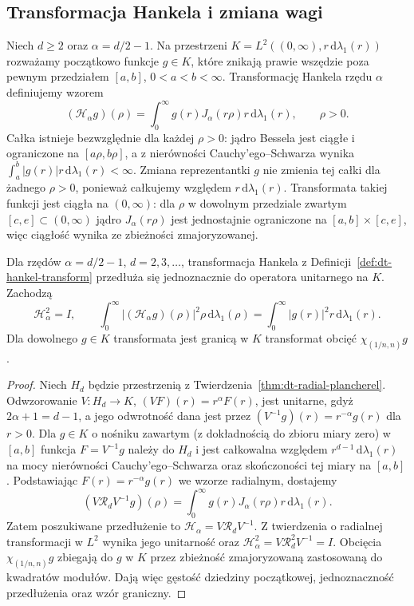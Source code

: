 \subsection{Transformacja Hankela i zmiana wagi}

\begin{definicja}
\label{def:dt-hankel-transform}
Niech $d\ge2$ oraz $\alpha=d/2-1$. Na przestrzeni
$K=L^2((0,\infty),r\,\mathrm d\lambda_1(r))$
rozważamy początkowo funkcje $g\in K$, które znikają
prawie wszędzie poza pewnym przedziałem $[a,b]$,
$0<a<b<\infty$. Transformację Hankela rzędu $\alpha$
definiujemy wzorem
\[
 (\mathcal H_\alpha g)(\rho)
 =\int_0^\infty g(r)J_\alpha(r\rho)r\,
 \mathrm d\lambda_1(r),\qquad \rho>0.
\]
Całka istnieje bezwzględnie dla każdej $\rho>0$:
jądro Bessela jest ciągłe i ograniczone na $[a\rho,b\rho]$,
a z nierówności Cauchy'ego--Schwarza wynika
$\int_a^b |g(r)|r\,\mathrm d\lambda_1(r)<\infty$.
Zmiana reprezentantki $g$ nie zmienia tej całki
dla żadnego $\rho>0$, ponieważ całkujemy względem
$r\,\mathrm d\lambda_1(r)$. Transformata takiej funkcji
jest ciągła na $(0,\infty)$: dla $\rho$ w dowolnym
przedziale zwartym $[c,e]\subset(0,\infty)$ jądro
$J_\alpha(r\rho)$ jest jednostajnie ograniczone
na $[a,b]\times[c,e]$, więc ciągłość wynika ze
zbieżności zmajoryzowanej.
\end{definicja}

\begin{twierdzenie}
\label{thm:dt-hankel-plancherel}
Dla rzędów $\alpha=d/2-1$, $d=2,3,\ldots$,
transformacja Hankela z Definicji~\ref{def:dt-hankel-transform}
przedłuża się jednoznacznie do operatora unitarnego na $K$.
Zachodzą
\[
 \mathcal H_\alpha^2=I,\qquad
 \int_0^\infty |(\mathcal H_\alpha g)(\rho)|^2\rho\,
 \mathrm d\lambda_1(\rho)
 =\int_0^\infty |g(r)|^2r\,\mathrm d\lambda_1(r).
\]
Dla dowolnego $g\in K$ transformata jest granicą
w $K$ transformat obcięć $\chi_{(1/n,n)}g$.
\end{twierdzenie}
\begin{proof}
Niech $H_d$ będzie przestrzenią z
Twierdzenia~\ref{thm:dt-radial-plancherel}. Odwzorowanie
$V:H_d\to K$, $(VF)(r)=r^\alpha F(r)$, jest unitarne,
gdyż $2\alpha+1=d-1$, a jego odwrotność dana jest przez
$(V^{-1}g)(r)=r^{-\alpha}g(r)$ dla $r>0$.
Dla $g\in K$ o nośniku zawartym (z dokładnością do zbioru
miary zero) w $[a,b]$ funkcja $F=V^{-1}g$ należy do
$H_d$ i jest całkowalna względem
$r^{d-1}\,\mathrm d\lambda_1(r)$ na mocy nierówności
Cauchy'ego--Schwarza oraz skończoności tej miary na $[a,b]$.
Podstawiając $F(r)=r^{-\alpha}g(r)$ we wzorze radialnym,
dostajemy
\[
 (V\mathcal R_dV^{-1}g)(\rho)
 =\int_0^\infty g(r)J_\alpha(r\rho)r\,\mathrm d\lambda_1(r).
\]
Zatem poszukiwane przedłużenie to
$\mathcal H_\alpha=V\mathcal R_dV^{-1}$.
Z twierdzenia o radialnej transformacji w $L^2$
wynika jego unitarność oraz
$\mathcal H_\alpha^2=V\mathcal R_d^2V^{-1}=I$.
Obcięcia $\chi_{(1/n,n)}g$ zbiegają do $g$ w $K$
przez zbieżność zmajoryzowaną zastosowaną do kwadratów
modułów. Dają więc gęstość dziedziny początkowej,
jednoznaczność przedłużenia oraz wzór graniczny.
\end{proof}

